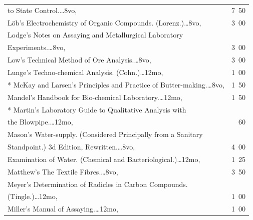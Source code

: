 \documentclass[a4paper,12pt]{book}[2004/02/16]
\theoremstyle{ilemma}
\theoremstyle{itheorem}
\theoremstyle{iother}
\theoremstyle{icorollary}
\theoremstyle{numcorollary}
\theoremstyle{idefinition}
\begin{document}
\begin{longtable}{@{}l@{ }r@{}}
\nopagebreak
\indent\indent to State Control.\dotfill\ldots 8vo, &7\ 50\\

L\"{o}b's Electrochemistry of Organic
Compounds. (Lorenz.)\dotfill\ldots 8vo, &3\ 00\\

Lodge's Notes on Assaying and Metallurgical Laboratory\\

\nopagebreak
\indent\indent Experiments.\dotfill\ldots 8vo, &3\ 00\\

Low's Technical Method of Ore Analysis.\dotfill\ldots 8vo, &3\ 00\\

Lunge's Techno-chemical Analysis. (Cohn.)\dotfill\ldots 12mo, &1\ 00\\

* McKay and Larsen's Principles and Practice of
  Butter-making.\dotfill\ldots 8vo, &1\ 50\\

Mandel's Handbook for Bio-chemical Laboratory.\dotfill\ldots 12mo, &1\ 50\\

* Martin's Laboratory Guide to Qualitative Analysis with\\

\nopagebreak
\indent\indent the Blowpipe.\dotfill\ldots 12mo, &60\\

Mason's Water-supply. (Considered Principally from a Sanitary\\

\nopagebreak
\indent\indent Standpoint.) 3d Edition, Rewritten.\dotfill\ldots 8vo,
&4\ 00\\

\nopagebreak
\indent Examination of Water. (Chemical and
Bacteriological.)\dotfill\ldots 12mo, &1\ 25\\

Matthew's The Textile Fibres.\dotfill\ldots 8vo, &3\ 50\\

Meyer's Determination of Radicles in Carbon Compounds.\\

\nopagebreak
\indent\indent (Tingle.)\dotfill\ldots 12mo, &1\ 00\\

Miller's Manual of Assaying.\dotfill\ldots 12mo, &1\ 00\\


\end{longtable}
\end{document}
